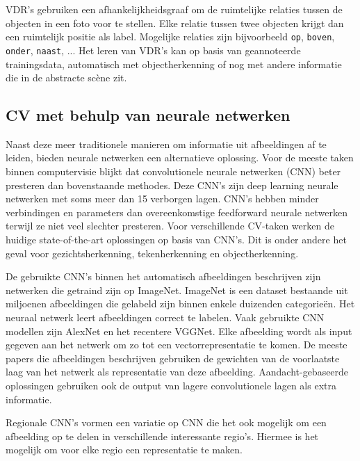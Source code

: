 VDR's gebruiken een afhankelijkheidsgraaf om de ruimtelijke relaties tussen de objecten in een foto voor te stellen. Elke relatie tussen twee objecten krijgt dan een ruimtelijk positie als label. Mogelijke relaties zijn bijvoorbeeld \texttt{op}, \texttt{boven}, \texttt{onder}, \texttt{naast}, ... Het leren van VDR's kan op basis van geannoteerde trainingsdata, automatisch met objectherkenning\cite{Elliott2015} of nog met andere informatie die in de abstracte sc\`ene zit\cite{Gilberto2015}.  

\subsection{CV met behulp van neurale netwerken}
Naast deze meer traditionele manieren om informatie uit afbeeldingen af te leiden, bieden neurale netwerken een alternatieve oplossing.
Voor de meeste taken binnen computervisie blijkt dat convolutionele neurale netwerken (CNN) beter presteren dan bovenstaande methodes. Deze CNN's zijn deep learning neurale netwerken met soms meer dan 15 verborgen lagen. CNN's hebben minder verbindingen en parameters dan overeenkomstige feedforward neurale netwerken terwijl ze niet veel slechter presteren\cite{Krizhevsky2012a}. 
Voor verschillende CV-taken werken de huidige state-of-the-art oplossingen op basis van CNN's. Dit is onder andere het geval voor gezichtsherkenning\cite{Zhou2015}, tekenherkenning\cite{Ciresan2012} en objectherkenning\cite{Szegedy2014}.

De gebruikte CNN's binnen het automatisch afbeeldingen beschrijven zijn netwerken die getraind zijn op ImageNet\cite{Russakovsky2014}. ImageNet is een dataset bestaande uit miljoenen afbeeldingen die gelabeld zijn binnen enkele duizenden categorie\"en. Het neuraal netwerk leert afbeeldingen correct te labelen. Vaak gebruikte CNN modellen zijn AlexNet\cite{Krizhevsky2012a} en het recentere VGGNet\cite{Arge2015}. Elke afbeelding wordt als input gegeven aan het netwerk om zo tot een vectorrepresentatie te komen. De meeste papers die afbeeldingen beschrijven gebruiken de gewichten van de voorlaatste laag van het netwerk als representatie van deze afbeelding\cite{Chen2014,Karpathy2015,Mao2014a,Google}. Aandacht-gebaseerde oplossingen\cite{Jin2015,Xu2015} gebruiken ook de output van lagere convolutionele lagen als extra informatie.

Regionale CNN's vormen een variatie op CNN die het ook mogelijk om een afbeelding op te delen in verschillende interessante regio's. Hiermee is het mogelijk om voor elke regio een representatie te maken\cite{Karpathy2015,Mitchell2015}. 

